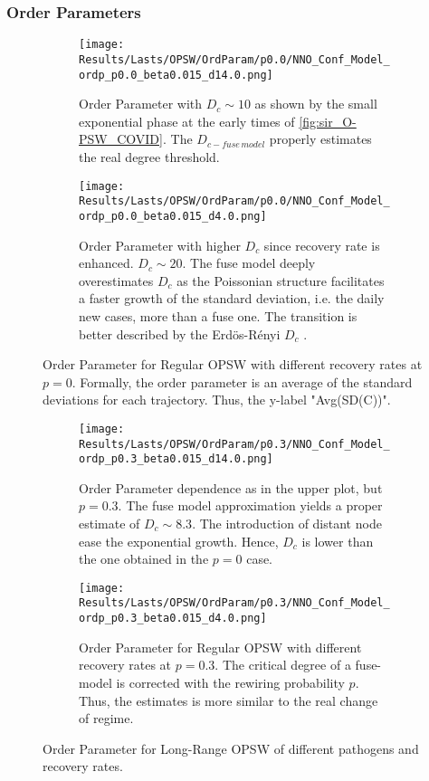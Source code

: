 \documentclass[a4paper,10pt]{book} %
\theoremstyle{definition}
\begin{document}
\subsubsection*{Order Parameters}
\begin{figure}[t]
	\begin{subfigure}[t]{0.48\linewidth}
		\centering
		\texttt{[image: Results/Lasts/OPSW/OrdParam/p0.0/NNO\_Conf\_Model\_ordp\_p0.0\_beta0.015\_d14.0.png]} 
		\caption{Order Parameter with $D_c \sim 10$ as shown by the small exponential phase at the early times of \autoref{fig:sir_O-PSW_COVID}. The $ D_{c-fuse\, model}$ properly estimates the real degree threshold.}
		\label{fig:Ordp_OPSW_COVID19_D14}
	\end{subfigure}
	\hfill
	\begin{subfigure}[t]{0.48\linewidth}
		\centering
		\texttt{[image: Results/Lasts/OPSW/OrdParam/p0.0/NNO\_Conf\_Model\_ordp\_p0.0\_beta0.015\_d4.0.png]}
		\caption{Order Parameter with higher $D_c$ since recovery rate is enhanced. $D_c \sim 20$.
		The fuse model deeply overestimates $ D_c$ as the Poissonian structure facilitates a faster growth of the standard deviation, i.e. the daily new cases, more than a fuse one. The transition is better described by the Erdös-Rényi $ D_c$ .}
		\label{fig:Ordp_OPSW_highmu_COVID19}
	\end{subfigure}
	\caption{Order Parameter for Regular OPSW with different recovery rates at $p = 0$. Formally, the order parameter is an average of the standard deviations for each trajectory. Thus, the y-label "Avg(SD(C))".}
	\label{fig:Ordp_OPSW_COVID19_panel}
\end{figure}

\begin{figure}[t]
	\begin{subfigure}[t]{0.48\linewidth}
		\texttt{[image: Results/Lasts/OPSW/OrdParam/p0.3/NNO\_Conf\_Model\_ordp\_p0.3\_beta0.015\_d14.0.png]}
		\caption{Order Parameter dependence as in the upper plot, but $ p = 0.3$. The fuse model approximation yields a proper estimate of $ D_c \sim 8.3$. The introduction of distant node ease the exponential growth. Hence, $ D_c$ is lower than the one obtained in the $ p = 0$ case.}
		\label{fig:Ordp_OPSW_Dc8.3_p0.3}
	\end{subfigure}
	\hfill
	\begin{subfigure}[t]{0.48\linewidth}
		\texttt{[image: Results/Lasts/OPSW/OrdParam/p0.3/NNO\_Conf\_Model\_ordp\_p0.3\_beta0.015\_d4.0.png]}
		\caption{Order Parameter for Regular OPSW with different recovery rates at $p = 0.3$.
		The critical degree of a fuse-model is corrected with the rewiring probability $ p$. Thus, the estimates is more similar to the real change of regime.}
		\label{fig:Ordp_OPSW_highmu_p0.3}
	\end{subfigure}
	\caption{Order Parameter for Long-Range OPSW of different pathogens and recovery rates.}
	\label{fig:Ordp_OPSW_COVID19_p0.3_panel}
\end{figure}
\end{document}
